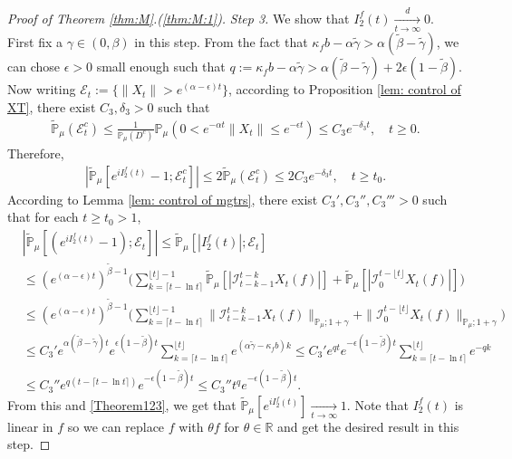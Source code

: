 \documentclass[12pt,a4paper]{amsart}
\theoremstyle{plain}
\theoremstyle{definition}
\numberwithin{equation}{section}
\begin{document}
\begin{proof}[Proof of Theorem \ref{thm:M}.(\ref{thm:M:1})]
  \emph{Step 3.}
  We show that $I^f_2(t)\xrightarrow[t\to \infty]{d} 0$.
  First fix a $\gamma \in (0,\beta)$ in this step.
  From the fact that $\kappa_f b -\alpha \tilde \gamma > \alpha (\tilde \beta - \tilde \gamma)$, we can chose $\epsilon >0$ small enough such that $q:=\kappa_fb- \alpha \tilde \gamma  > \alpha (\tilde \beta - \tilde \gamma) + 2\epsilon (1 - \tilde \beta)$.
  Now writing $\mathcal{E}_t:=\{\|X_t\|>e^{(\alpha-\epsilon) t}\}$, according to Proposition \ref{lem: control of XT}, there exist $C_3, \delta_3>0$ such that
  \begin{align}
    \mathbb{\widetilde{P}}_{\mu}(\mathcal{E}^c_t)
    \leq \frac{1}{\mathbb{P}_{\mu}(D^c)}\mathbb{P}_{\mu}(0<e^{-\alpha t}\|X_t\|\leq e^{-\epsilon t})\leq C_3e^{-\delta_3 t}
    , \quad t\geq0.
  \end{align}
  Therefore,
  \begin{align}
    \label{Theorem123}
    |\mathbb{\widetilde{P}}_{\mu}[e^{i I^f_2(t)}-1;\mathcal{E}^c_t]|
    \leq 2\mathbb{\widetilde{P}}_{\mu}(\mathcal{E}^c_t)
    \leq 2C_3e^{-\delta_3 t},
    \quad t\geq t_0.
  \end{align}
	According to Lemma \ref{lem: control of mgtrs}, there exist $C_3',C_3'',C_3'''>0$ such that for each $t\geq t_0 >1$,
  \begin{align}
    & |\mathbb{\widetilde{P}}_{\mu} [ (e^{i I^f_2(t)}-1);\mathcal{E}_t]|
      \leq  \mathbb{\widetilde{P}}_{\mu} [ |I^f_2(t)|;\mathcal{E}_t] \\
    & \leq  ( e^{(\alpha-\epsilon) t} )^{\tilde \beta - 1}\Big(\sum_{k=\lceil t-\ln t \rceil}^{\lfloor t \rfloor - 1}\mathbb{\widetilde{P}}_{\mu} [| \mathcal{I}_{t-k-1}^{t-k} X_t(f) |] + \mathbb{\widetilde{P}}_{\mu}[| \mathcal{I}_{0}^{t-\lfloor t\rfloor} X_t(f)|]\Big) \\
    & \leq ( e^{(\alpha-\epsilon) t} )^{\tilde \beta - 1}\Big(\sum_{k=\lceil t-\ln t \rceil}^{\lfloor t \rfloor - 1}\|\mathcal{I}_{t-k-1}^{t-k} X_t(f) \|_{\mathbb P_\mu; 1+\gamma} + \|\mathcal I_0^{t-\lfloor t \rfloor} X_t(f)\|_{\mathbb P_\mu;1+\gamma}\Big) \\
    & \leq C_3' e^{\alpha (\tilde \beta - \tilde \gamma)t} e ^{\epsilon (1-\tilde \beta) t}\sum_{k=\lceil t-\ln t \rceil}^{\lfloor t \rfloor}  e^{(\alpha\tilde \gamma-\kappa_f b)k}
      \leq C_3' e^{q t}e^{-\epsilon ( 1 - \tilde \beta)t}\sum_{k=\lceil t-\ln t \rceil}^{\lfloor t \rfloor}  e^{-q k}
    \\ & \leq C_3'' e^{q(t - \lceil t - \ln t\rceil)}e^{-\epsilon(1 - \tilde \beta) t}
         \leq C_3'' t^q e^{- \epsilon(1 - \tilde \beta) t}.
  \end{align}
  From this and \eqref{Theorem123}, we get that $\widetilde {\mathbb P}_\mu[e^{i I^f_2(t)}] \xrightarrow[t\to \infty]{} 1$.
  Note that $I^f_2(t)$ is linear in $f$ so we can replace $f$ with $\theta f$ for $\theta \in \mathbb R$ and get the desired result in this step.


\end{proof}
\end{document}
